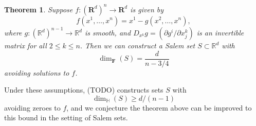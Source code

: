\documentclass[12pt]{article}
\numberwithin{equation}{section}
\theoremstyle{plain}
\newtheorem*{thm}{Theorem}
\theoremstyle{remark}
\begin{document}
{{\begin{multicols}{2}
{\vspace{-0.5cm}

\begin{thm}
    Suppose $f: (\mathbf{R}^d)^n \to \mathbf{R}^d$ is given by
    \[ f(x^1,\dots,x^n) = x^1 - g(x^2,\dots,x^n), \]
    where $g: (\mathbb{R}^d)^{n-1} \to \mathbb{R}^d$ is smooth, and $D_{x^k} g = (\partial g^i / \partial x^k_j)$ is an invertible matrix for all $2 \leq k \leq n$. Then we can construct a Salem set $S \subset \mathbb{R}^d$ with
    \[ \dim_{\mathbf{F}}(S) = \frac{d}{n - 3/4} \]
    avoiding solutions to $f$.
\end{thm}

Under these assumptions, (TODO) constructs sets $S$ with
%
\[ \dim_{\mathbb{H}}(S) \geq d/(n-1) \]
%
avoiding zeroes to $f$, and we conjecture the theorem above can be improved to this bound in the setting of Salem sets.
}




\end{multicols}}}\\


\end{document}
